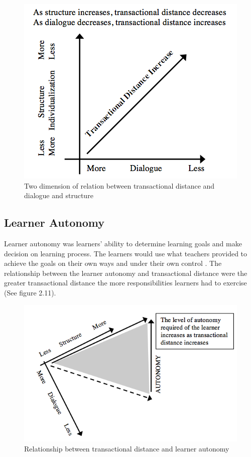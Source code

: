 \begin{figure}[!hbt]
\centering
\includegraphics[width=0.65 \textwidth]{tdt4}
\caption {Two dimension of relation between transactional distance and dialogue and structure \cite[pp. 71]{moore2013handbook}}
\end{figure}


\subsection {Learner Autonomy} 
Learner autonomy was learners' ability to determine learning goals and make decision on learning process. The learners would use what teachers provided to achieve the goals on their own ways and under their own control \cite{moore1993theory}. The relationship between the learner autonomy and transactional distance were the greater transactional distance the more responsibilities learners had to exercise (See figure 2.11). 

\begin{figure}[!hbt]
\centering
\includegraphics[width=0.65 \textwidth]{tdt5}
\caption {Relationship between transactional distance and learner autonomy \cite{moore1993theory}}
\end{figure}

